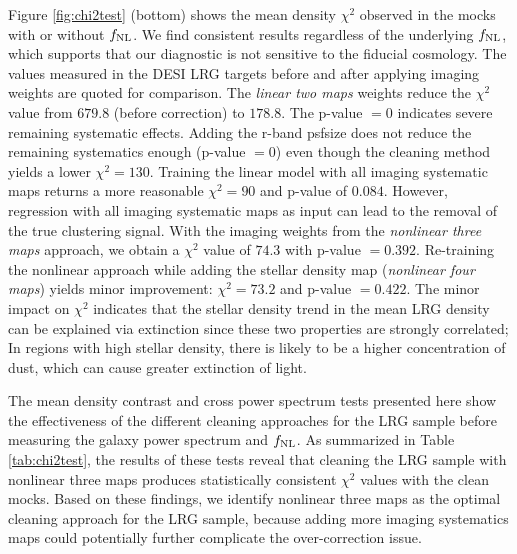 Figure \ref{fig:chi2test} (bottom) shows the mean density $\chi^{2}$ observed in the mocks with or without $f_{\rm NL}$. We find consistent results regardless of the underlying $f_{\rm NL}$, which supports that our diagnostic is not sensitive to the fiducial cosmology. The values measured in the DESI LRG targets before and after applying imaging weights are quoted for comparison. The \textit{linear two maps} weights reduce the $\chi^{2}$ value from $679.8$ (before correction) to $178.8$. The p-value $=0$ indicates severe remaining systematic effects. Adding the r-band psfsize does not reduce the remaining systematics enough (p-value $=0$) even though the cleaning method yields a lower $\chi^{2}=130$. Training the linear model with all imaging systematic maps returns a more reasonable $\chi^{2}=90$ and p-value of $0.084$. However, regression with all imaging systematic maps as input can lead to the removal of the true clustering signal. With the imaging weights from the \textit{nonlinear three maps} approach, we obtain a $\chi^{2}$ value of $74.3$ with p-value $=0.392$. Re-training the nonlinear approach while adding the stellar density map (\textit{nonlinear four maps}) yields minor improvement: $\chi^{2}=73.2$ and p-value $=0.422$. The minor impact on $\chi^{2}$ indicates that the stellar density trend in the mean LRG density can be explained via extinction since these two properties are strongly correlated; In regions with high stellar density, there is likely to be a higher concentration of dust, which can cause greater extinction of light.

The mean density contrast and cross power spectrum tests presented here show the effectiveness of the different cleaning approaches for the LRG sample before measuring the galaxy power spectrum and $f_{\rm NL}$. As summarized in Table \ref{tab:chi2test}, the results of these tests reveal that cleaning the LRG sample with nonlinear three maps produces statistically consistent $\chi^{2}$ values with the clean mocks. Based on these findings, we identify nonlinear three maps as the optimal cleaning approach for the LRG sample, because adding more imaging systematics maps could potentially further complicate the over-correction issue.


